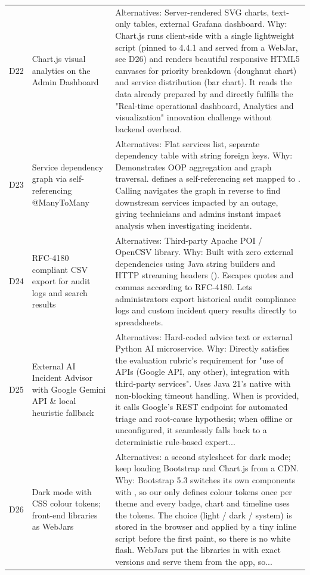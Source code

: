 \begin{longtable}{@{}L{0.9cm}L{4.3cm}L{10cm}@{}}
D22 & Chart.js visual analytics on the Admin Dashboard & Alternatives: Server-rendered SVG charts, text-only tables, external Grafana dashboard. Why: Chart.js runs client-side with a single lightweight script (pinned to 4.4.1 and served from a WebJar, see D26) and renders beautiful responsive HTML5 canvases for priority breakdown (doughnut chart) and service distribution (bar chart). It reads the data already prepared by  and directly fulfills the "Real-time operational dashboard, Analytics and visualization" innovation challenge without backend overhead. \\
D23 & Service dependency graph via self-referencing @ManyToMany & Alternatives: Flat services list, separate dependency table with string foreign keys. Why: Demonstrates OOP aggregation and graph traversal.  defines a self-referencing  set  mapped to . Calling  navigates the graph in reverse to find downstream services impacted by an outage, giving technicians and admins instant impact analysis when investigating incidents. \\
D24 & RFC-4180 compliant CSV export for audit logs and search results & Alternatives: Third-party Apache POI / OpenCSV library. Why: Built with zero external dependencies using Java string builders and HTTP streaming headers (). Escapes quotes and commas according to RFC-4180. Lets administrators export historical audit compliance logs and custom incident query results directly to spreadsheets. \\
D25 & External AI Incident Advisor with Google Gemini API \& local heuristic fallback & Alternatives: Hard-coded advice text or external Python AI microservice. Why: Directly satisfies the evaluation rubric's requirement for "use of APIs (Google API, any other), integration with third-party services". Uses Java 21's native  with non-blocking timeout handling. When  is provided, it calls Google's  REST endpoint for automated triage and root-cause hypothesis; when offline or unconfigured, it seamlessly falls back to a deterministic rule-based expert... \\
D26 & Dark mode with CSS colour tokens; front-end libraries as WebJars & Alternatives: a second stylesheet for dark mode; keep loading Bootstrap and Chart.js from a CDN. Why: Bootstrap 5.3 switches its own components with , so our  only defines colour tokens once per theme and every badge, chart and timeline uses the tokens. The choice (light / dark / system) is stored in the browser and applied by a tiny inline script before the first paint, so there is no white flash. WebJars put the libraries in  with exact versions and serve them from the app, so... \\
\bottomrule
\end{longtable}
